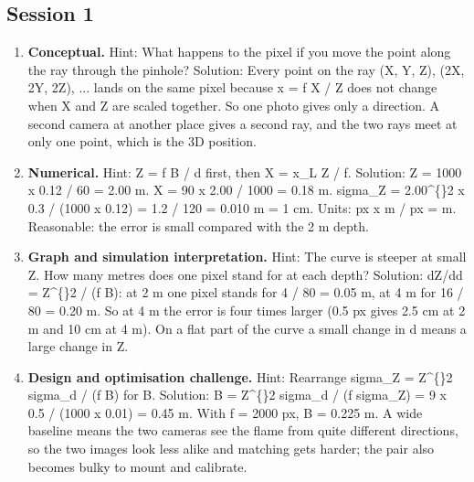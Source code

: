 \documentclass[11pt,a4paper]{article}
\begin{document}
\subsection*{Session 1}
\begin{enumerate}[nosep]
\item \textbf{Conceptual.} Hint: What happens to the pixel if you move the point along the ray through the pinhole? Solution: Every point on the ray (X, Y, Z), (2X, 2Y, 2Z), ... lands on the same pixel because x = f X / Z does not change when X and Z are scaled together. So one photo gives only a direction. A second camera at another place gives a second ray, and the two rays meet at only one point, which is the 3D position.
\item \textbf{Numerical.} Hint: Z = f B / d first, then X = x\_L Z / f. Solution: Z = 1000 x 0.12 / 60 = 2.00 m. X = 90 x 2.00 / 1000 = 0.18 m. sigma\_Z = 2.00\textasciicircum\{\}2 x 0.3 / (1000 x 0.12) = 1.2 / 120 = 0.010 m = 1 cm. Units: px x m / px = m. Reasonable: the error is small compared with the 2 m depth.
\item \textbf{Graph and simulation interpretation.} Hint: The curve is steeper at small Z. How many metres does one pixel stand for at each depth? Solution: dZ/dd = Z\textasciicircum\{\}2 / (f B): at 2 m one pixel stands for 4 / 80 = 0.05 m, at 4 m for 16 / 80 = 0.20 m. So at 4 m the error is four times larger (0.5 px gives 2.5 cm at 2 m and 10 cm at 4 m). On a flat part of the curve a small change in d means a large change in Z.
\item \textbf{Design and optimisation challenge.} Hint: Rearrange sigma\_Z = Z\textasciicircum\{\}2 sigma\_d / (f B) for B. Solution: B = Z\textasciicircum\{\}2 sigma\_d / (f sigma\_Z) = 9 x 0.5 / (1000 x 0.01) = 0.45 m. With f = 2000 px, B = 0.225 m. A wide baseline means the two cameras see the flame from quite different directions, so the two images look less alike and matching gets harder; the pair also becomes bulky to mount and calibrate.
\end{enumerate}
\end{document}
